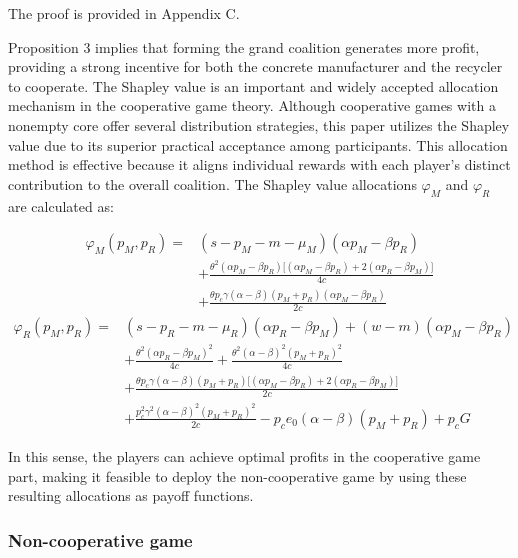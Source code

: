 \documentclass[authoryear,preprint,review,times,10pt]{elsarticle}
\begin{document}
 The proof is provided in Appendix C.

Proposition 3 implies that forming the grand coalition generates more profit, providing a strong incentive for both the concrete manufacturer and the recycler to cooperate. 
The Shapley value is an important and widely accepted allocation mechanism in the cooperative game theory. Although cooperative games with a nonempty core offer several distribution strategies, this paper utilizes the Shapley value due to its superior practical acceptance among participants. This allocation method is effective because it aligns individual rewards with each player's distinct contribution to the overall coalition. The Shapley value allocations $\varphi_M$ and $\varphi_R$ are calculated as:

\begin{equation}
\begin{aligned}
\varphi_M(p_M, p_R) =& (s - p_M - m - \mu_M)(\alpha p_M - \beta p_R) \\
&+ \frac{\theta^2(\alpha p_M - \beta p_R)\big[(\alpha p_M - \beta p_R) + 2(\alpha p_R - \beta p_M)\big]}{4c} \\
&+ \frac{\theta p_c \gamma (\alpha - \beta)(p_M + p_R)(\alpha p_M - \beta p_R)}{2c}
\end{aligned}
\end{equation}
\begin{equation}
\begin{aligned}
\varphi_R(p_M, p_R) =& (s - p_R - m - \mu_R)(\alpha p_R - \beta p_M) + (w - m)(\alpha p_M - \beta p_R) \\
&+ \frac{\theta^2(\alpha p_R - \beta p_M)^2}{4c} + \frac{\theta^2(\alpha - \beta)^2(p_M + p_R)^2}{4c} \\
&+ \frac{\theta p_c \gamma (\alpha - \beta)(p_M + p_R)\big[(\alpha p_M - \beta p_R) + 2(\alpha p_R - \beta p_M)\big]}{2c} \\
&+ \frac{p_c^2 \gamma^2 (\alpha - \beta)^2 (p_M + p_R)^2}{2c} - p_c e_0 (\alpha - \beta)(p_M + p_R) + p_c G
\end{aligned}
\end{equation}

In this sense, the players can achieve optimal profits in the cooperative game part, making it feasible to deploy the non-cooperative game by using these resulting allocations as payoff functions.

\subsubsection{Non-cooperative game}
\label{sec:noncooperative_game}
\end{document}
